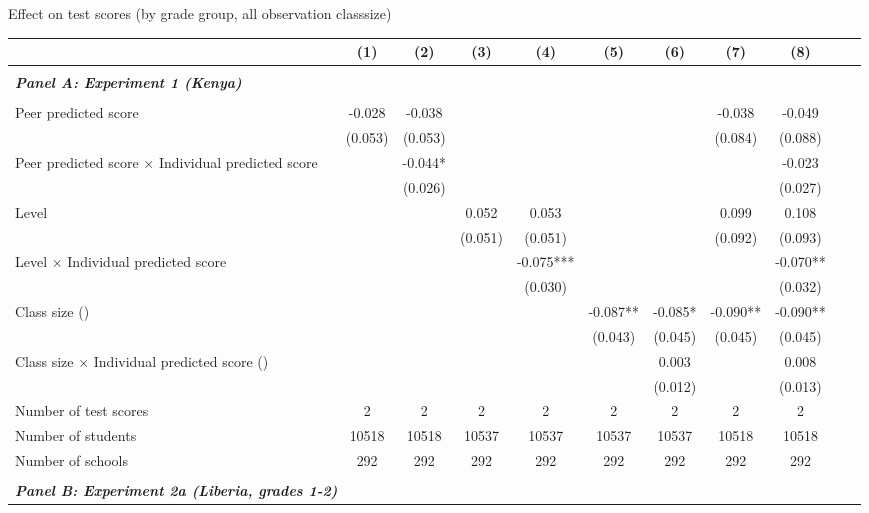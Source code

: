 \begin{center} 
\caption{\small Effect on test scores (by grade group, all observation classsize)} 
\label{tab:descriptives} 
\begin{scriptsize}
\begin{threeparttable}
\begin{tabular} {@{} l l c c c c c c c c c c  @{}} \toprule \toprule
& &(1)&(2)&(3)&(4)&(5)&(6)&(7)&(8) \\ \midrule 
\\
\multicolumn{3}{l}{\textbf{\textit{Panel A: Experiment 1 (Kenya)}}} \\
\\
Peer predicted score &  & -0.028 & -0.038 &  &  &  &  & -0.038 & -0.049 \\
                 &  & (0.053) & (0.053) &  &  &  &  & (0.084) & (0.088) \\
Peer predicted score $\times$ Individual predicted score &  &  & -0.044* &  &  &  &  &  & -0.023 \\
                 &  &  & (0.026) &  &  &  &  &  & (0.027) \\
Level &  &  &  & 0.052 & 0.053 &  &  & 0.099 & 0.108 \\
                 &  &  &  & (0.051) & (0.051) &  &  & (0.092) & (0.093) \\
Level $\times$ Individual predicted score &  &  &  &  & -0.075*** &  &  &  & -0.070** \\
                 &  &  &  &  & (0.030) &  &  &  & (0.032) \\
Class size (\times 10) &  &  &  &  &  & -0.087** & -0.085* & -0.090** & -0.090** \\
                 &  &  &  &  &  & (0.043) & (0.045) & (0.045) & (0.045) \\
Class size $\times$ Individual predicted score (\times 10) &  &  &  &  &  &  & 0.003 &  & 0.008 \\
                 &  &  &  &  &  &  & (0.012) &  & (0.013) \\
\midrule
Number of test scores &  & 2 & 2 & 2 & 2 & 2 & 2 & 2 & 2 \\
Number of students &  & 10518 & 10518 & 10537 & 10537 & 10537 & 10537 & 10518 & 10518 \\
Number of schools &  & 292 & 292 & 292 & 292 & 292 & 292 & 292 & 292 \\
 \midrule
\\
\multicolumn{3}{l}{\textbf{\textit{Panel B: Experiment 2a (Liberia, grades 1-2)}}} \\

\end{tabular}
\end{threeparttable}
\end{scriptsize}
\end{center}
